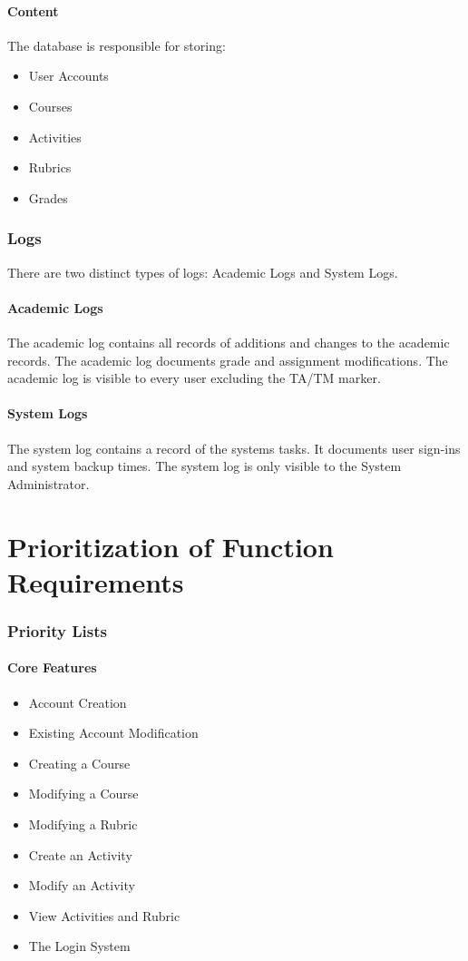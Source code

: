 \documentclass{article}
\begin{document}
\subsection{Content}
The database is responsible for storing:
\begin{itemize}
\item User Accounts
\item Courses
\item Activities
\item Rubrics
\item Grades
\end{itemize}

\section{Logs}
There are two distinct types of logs: Academic Logs and System Logs.
\subsection{Academic Logs}
The academic log contains all records of additions and changes to the academic records.
The academic log documents grade and assignment modifications.  The academic log
is visible to every user excluding the TA/TM marker.
\subsection{System Logs}
The system log contains a record of the systems tasks.  It documents user sign-ins
and system backup times. The system log is only visible to the System Administrator.

\part{Prioritization of Function Requirements}
\section{Priority Lists}
\subsection{Core Features}
\begin{itemize}
  \item Account Creation
  \item Existing Account Modification
  \item Creating a Course
  \item Modifying a Course
  \item Modifying a Rubric
  \item Create an Activity
  \item Modify an Activity
  \item View Activities and Rubric
  \item The Login System
\end{itemize}
\end{document}
